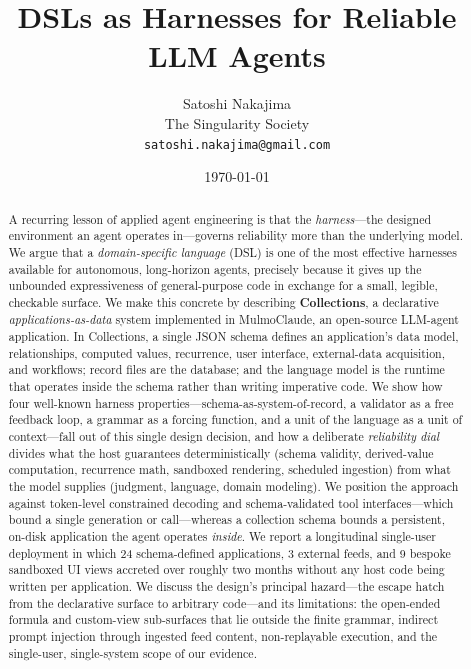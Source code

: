 \documentclass[11pt]{article}
\title{\textbf{DSLs as Harnesses for Reliable LLM Agents}}
\author{
  Satoshi Nakajima\\
  \small The Singularity Society\\
  \small \texttt{satoshi.nakajima@gmail.com}
}
\date{\today}
\begin{document}
\maketitle

\begin{abstract}
A recurring lesson of applied agent engineering is that the \emph{harness}---the
designed environment an agent operates in---governs reliability more than the
underlying model. We argue that a \emph{domain-specific language} (DSL) is one of
the most effective harnesses available for autonomous, long-horizon agents,
precisely because it gives up the unbounded expressiveness of general-purpose
code in exchange for a small, legible, checkable surface. We make this concrete
by describing \textbf{Collections}, a declarative \emph{applications-as-data}
system implemented in MulmoClaude, an open-source LLM-agent application. In
Collections, a single JSON schema defines an application's data model,
relationships, computed values, recurrence, user interface, external-data
acquisition, and workflows; record files are the database; and the language model
is the runtime that operates inside the schema rather than writing imperative
code. We show how four well-known harness properties---schema-as-system-of-record,
a validator as a free feedback loop, a grammar as a forcing function, and a unit
of the language as a unit of context---fall out of this single design decision,
and how a deliberate \emph{reliability dial} divides what the host guarantees
deterministically (schema validity, derived-value computation, recurrence math,
sandboxed rendering, scheduled ingestion) from what the model supplies (judgment,
language, domain modeling). We position the approach against token-level
constrained decoding and schema-validated tool interfaces---which bound a single
generation or call---whereas a collection schema bounds a persistent, on-disk
application the agent operates \emph{inside}. We report a longitudinal single-user
deployment in which 24 schema-defined applications, 3 external feeds, and 9 bespoke
sandboxed UI views accreted over roughly two months without any host code being
written per application. We discuss the design's principal hazard---the escape hatch from the
declarative surface to arbitrary code---and its limitations: the open-ended
formula and custom-view sub-surfaces that lie outside the finite grammar, indirect
prompt injection through ingested feed content, non-replayable execution, and the
single-user, single-system scope of our evidence.
\end{abstract}
\end{document}
